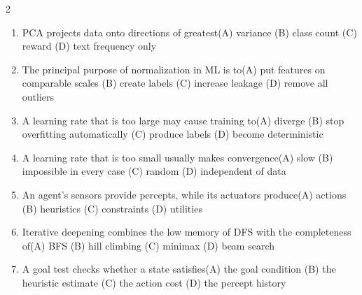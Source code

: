 \documentclass[a4paper]{article}
\begin{document}
\begin{multicols*}{2}
\begin{enumerate}[resume]
\item PCA projects data onto directions of greatest\newline\hspace*{0.6em}(A) variance \quad (B) class count \newline\hspace*{0.6em}(C) reward \quad (D) text frequency only
\item The principal purpose of normalization in ML is to\newline\hspace*{0.6em}(A) put features on comparable scales \quad (B) create labels \newline\hspace*{0.6em}(C) increase leakage \quad (D) remove all outliers
\item A learning rate that is too large may cause training to\newline\hspace*{0.6em}(A) diverge \quad (B) stop overfitting automatically \newline\hspace*{0.6em}(C) produce labels \quad (D) become deterministic
\item A learning rate that is too small usually makes convergence\newline\hspace*{0.6em}(A) slow \quad (B) impossible in every case \newline\hspace*{0.6em}(C) random \quad (D) independent of data
\item An agent's sensors provide percepts, while its actuators produce\newline\hspace*{0.6em}(A) actions \quad (B) heuristics \newline\hspace*{0.6em}(C) constraints \quad (D) utilities
\item Iterative deepening combines the low memory of DFS with the completeness of\newline\hspace*{0.6em}(A) BFS \quad (B) hill climbing \newline\hspace*{0.6em}(C) minimax \quad (D) beam search
\item A goal test checks whether a state satisfies\newline\hspace*{0.6em}(A) the goal condition \quad (B) the heuristic estimate \newline\hspace*{0.6em}(C) the action cost \quad (D) the percept history

\end{enumerate}
\end{multicols*}
\end{document}
